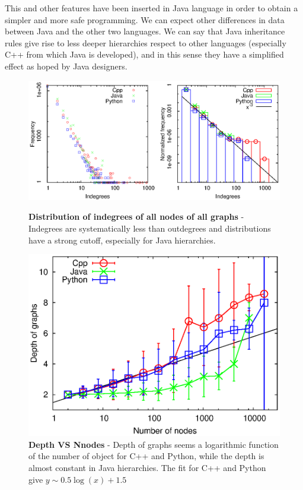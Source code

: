 This and other features have been inserted in Java language in order to obtain a simpler and more safe programming. We can expect other differences in data between Java and the other two languages. We can say that Java inheritance rules give rise to less deeper hierarchies respect to other languages (especially C++ from which Java is developed), and in this sense they have a simplified effect as hoped by Java designers.

\begin{figure}[p]%
\includegraphics[width=\textwidth,draft=false]{grafici/fDindeg.eps}
\caption{\label{Findeg} \footnotesize\textbf{Distribution of indegrees of all nodes of all graphs} - Indegrees are systematically less than outdegrees and distributions have a strong cutoff, especially for Java hierarchies.}
\vspace{1cm}
\includegraphics[width=\textwidth,draft=false]{grafici/depVSNnodes.err.eps}
\caption{\label{FdVSnerr} \footnotesize\textbf{Depth VS Nnodes } - Depth of graphs seems a logarithmic function of the number of object for C++ and Python, while the depth is almost constant in Java hierarchies. The fit for C++ and Python give $y \sim 0.5\log(x)+1.5$}
\end{figure}

